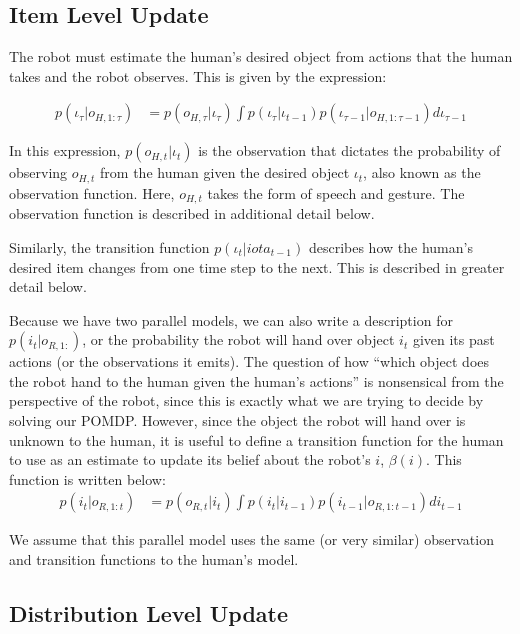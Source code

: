 \documentclass{article}
\begin{document}
\subsection{Item Level Update}

The robot must estimate the human's desired object from actions that the human takes and the robot observes. This is given by the expression: 

\begin{align*}
	p(\iota_\tau | o_{H,1:\tau}) &= p(o_{H,\tau}|\iota_\tau) \int p(\iota_\tau|\iota_{t-1})p(\iota_{\tau-1}|o_{H,1:\tau-1})d \iota_{\tau-1}
\end{align*}

In this expression, $p(o_{H,t}|\iota_t)$ is the observation that dictates the probability of observing $o_{H,t}$ from the human given the desired object $\iota_t$, also known as the observation function. Here, $o_{H,t}$ takes the form of speech and gesture. The observation function is described in additional detail below. 

Similarly, the transition function $p(\iota_t|iota_{t-1})$ describes how the human's desired item changes from one time step to the next. This is described in greater detail below. 

Because we have two parallel models, we can also write a description for $p(i_t | o_{R, 1:})$, or the probability the robot will hand over object $i_t$ given its past actions (or the observations it emits). The question of how ``which object does the robot hand to the human given the human's actions'' is nonsensical from the perspective of the robot, since this is exactly what we are trying to decide by solving our POMDP. However, since the object the robot will hand over is unknown to the human, it is useful to define a transition function for the human to use as an estimate to update its belief about the robot's $i$, $\beta(i)$. This function is written below: 
\begin{align*}
	p(i_t | o_{R,1:t}) &= p(o_{R,t}|i_t) \int p(i_t|i_{t-1})p(i_{t-1}|o_{R,1:t-1})d i_{t-1}
\end{align*}

We assume that this parallel model uses the same (or very similar) observation and transition functions to the human's model. 


\subsection{Distribution Level Update} 
\end{document}
